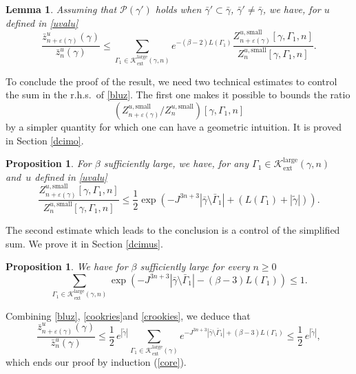 \documentclass[10pt]{amsart}
\let\mathcal\mathscr
\numberwithin{equation}{section}
\theoremstyle{plain}
\newtheorem{lemma}[theorem]{Lemma}
\newtheorem{proposition}[theorem]{Proposition}
\theoremstyle{definition}
\newcommand{\ext}{\mathrm{ext}}
\newcommand{\sm}{\mathrm{small}}
\newcommand{\larg}{\mathrm{large}}
\newcommand{\cP}{{\ensuremath{\mathcal P}} }
\newcommand{\cK}{{\ensuremath{\mathcal K}} }
\newcommand{\gb}{\beta}
\newcommand{\gep}{\varepsilon}
\newcommand{\gG}{\Gamma}
\begin{document}
\begin{lemma}\label{decopoz}
Assuming that $\cP(\gamma')$ holds when $\bar \gamma' \subset \bar \gamma$, $\bar \gamma'\ne \bar \gamma$,
we have, for $u$ defined in \eqref{uvalu}
\begin{equation}\label{bluz}
\frac{\bar z^u_{n+\gep(\gamma)}(\gamma)}{\bar z^u_{n}(\gamma)}\le \sum_{\gG_1\in \cK^{\larg}_{\ext}(\gamma,n)}
e^{-(\gb-2) L(\gG_1) } \frac{Z^{u,\sm}_{n+\gep(\gamma)}[\gamma,\gG_1,n]}{Z^{u,\sm}_{n}[\gamma,\gG_1,n]}.
\end{equation}
\end{lemma}

To conclude the proof of the result, we need two technical estimates to control the sum in the r.h.s.\ of \eqref{bluz}.
The first one makes it possible to bounds the ratio
\[
(Z^{u,\sm}_{n+\gep(\gamma)}/ Z^{u,\sm}_{n})[\gamma,\gG_1,n]
\]
by a simpler quantity for which one can have a
geometric intuition. It is proved in Section \ref{dcimo}.
\begin{proposition}\label{difficilissimo}
For $\gb$ sufficiently large, we have, for any $\gG_1\in \cK^{\larg}_{\ext}(\gamma,n)$ and~$u$ defined in \eqref{uvalu}
\begin{equation}\label{cookries}
\frac{Z^{u,\sm}_{n+\gep(\gamma)}[\gamma,\Gamma_1,n]}{Z^{u,\sm}_{n}[\gamma,\Gamma_1,n]}\le \frac{1}{2}
\exp\left(-J^{3n+3}|\bar \gamma\setminus \bar \gG_1|+(L(\gG_1)+|\tilde \gamma|)\right).
\end{equation}
\end{proposition}
The second estimate which leads to the conclusion is a control of the simplified sum.
We prove it in Section \ref{dcimus}.
\begin{proposition}\label{dificilissimus}
We have for $\gb$ sufficiently large for every $n\ge 0$
\begin{equation}\label{crookies}
\sum_{\gG_1\in \cK^{\larg}_{\ext}(\gamma,n)} \exp\left(-J^{3n+3}|\bar \gamma\setminus \bar \gG_1|-(\gb-3) L(\gG_1) \right)\le 1.
\end{equation}
\end{proposition}
Combining \eqref{bluz}, \eqref{cookries}and \eqref{crookies}, we deduce that
\begin{equation*}
\frac{\bar z^{u}_{n+\gep(\gamma)}(\gamma)}{\bar z^{u}_n(\gamma)}\le \frac{1}{2}\,e^{|\tilde \gamma|}
\sum_{\gG_1\in \cK^{\larg}_{\ext}(\gamma)} e^{-J^{3n+3} |\bar \gamma\setminus \bar \Gamma_1|+(\gb-3)L(\gG_1)}\le \frac{1}{2}\, e^{|\tilde \gamma|},
\end{equation*}
which ends our proof by induction (\cf \eqref{core}).
\end{document}
